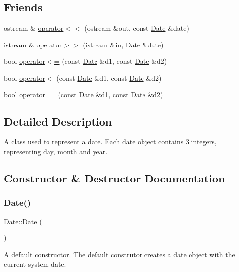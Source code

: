 \subsection*{Friends}
\begin{DoxyCompactItemize}
\item 
ostream \& \hyperlink{class_date_a5c29d00ecf33e6d232a410f1f3d6eb70}{operator$<$$<$} (ostream \&out, const \hyperlink{class_date}{Date} \&date)
\item 
istream \& \hyperlink{class_date_a5b292605462c1f43c993c0b2f5592cdc}{operator$>$$>$} (istream \&in, \hyperlink{class_date}{Date} \&date)
\item 
bool \hyperlink{class_date_a4f314b2216e8760eac284385a7eaae12}{operator$<$=} (const \hyperlink{class_date}{Date} \&d1, const \hyperlink{class_date}{Date} \&d2)
\item 
bool \hyperlink{class_date_a5a3f411cbd59e9ecb90b2f8e6aaea551}{operator$<$} (const \hyperlink{class_date}{Date} \&d1, const \hyperlink{class_date}{Date} \&d2)
\item 
bool \hyperlink{class_date_a18dc8aca1ca4d8cadc2b464db984135b}{operator==} (const \hyperlink{class_date}{Date} \&d1, const \hyperlink{class_date}{Date} \&d2)
\end{DoxyCompactItemize}


\subsection{Detailed Description}
A class used to represent a date. Each date object contains 3 integers, representing day, month and year. 

\subsection{Constructor \& Destructor Documentation}
\mbox{\label{class_date_a4e59ed4ba66eec61c27460c5d09fa1bd}} 
\subsubsection{\texorpdfstring{Date()}{Date()}\hspace{0.1cm}{\footnotesize\ttfamily [1/3]}}
{\footnotesize\ttfamily Date\+::\+Date (\begin{DoxyParamCaption}{ }\end{DoxyParamCaption})}

A default constructor. The default construtor creates a date object with the current system date. \mbox{\label{class_date_aed0ec4ac9e00fb6130f8a642a61180b9}} 
